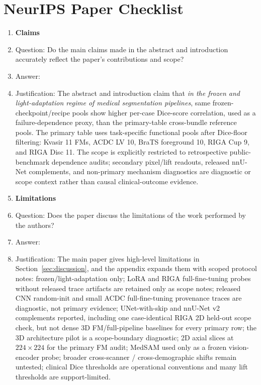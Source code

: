 \section*{NeurIPS Paper Checklist}

\small
\begin{enumerate}[leftmargin=*,itemsep=2pt,parsep=0pt,topsep=2pt]

\item {\bf Claims}
    \item[] Question: Do the main claims made in the abstract and introduction accurately reflect the paper's contributions and scope?
    \item[] Answer: \answerYes{}
    \item[] Justification: The abstract and introduction claim that \emph{in the frozen and light-adaptation regime of medical segmentation pipelines}, same frozen-checkpoint/recipe pools show higher per-case Dice-score correlation, used as a failure-dependence proxy, than the primary-table cross-bundle reference pools. The primary table uses task-specific functional pools after Dice-floor filtering: Kvasir 11 FMs, ACDC LV 10, BraTS foreground 10, RIGA Cup 9, and RIGA Disc 11. The scope is explicitly restricted to retrospective public-benchmark dependence audits; secondary pixel/lift readouts, released nnU-Net complements, and non-primary mechanism diagnostics are diagnostic or scope context rather than causal clinical-outcome evidence.

\item {\bf Limitations}
    \item[] Question: Does the paper discuss the limitations of the work performed by the authors?
    \item[] Answer: \answerYes{}
    \item[] Justification: The main paper gives high-level limitations in Section~\ref{sec:discussion}, and the appendix expands them with scoped protocol notes: frozen/light-adaptation only; LoRA and RIGA full-fine-tuning probes without released trace artifacts are retained only as scope notes; released CNN random-init and small ACDC full-fine-tuning provenance traces are diagnostic, not primary evidence; UNet-with-skip and nnU-Net v2 complements reported, including one case-identical RIGA 2D held-out scope check, but not dense 3D FM/full-pipeline baselines for every primary row; the 3D architecture pilot is a scope-boundary diagnostic; 2D axial slices at $224{\times}224$ for the primary FM audit; MedSAM used only as a frozen vision-encoder probe; broader cross-scanner / cross-demographic shifts remain untested; clinical Dice thresholds are operational conventions and many lift thresholds are support-limited.


\end{enumerate}
